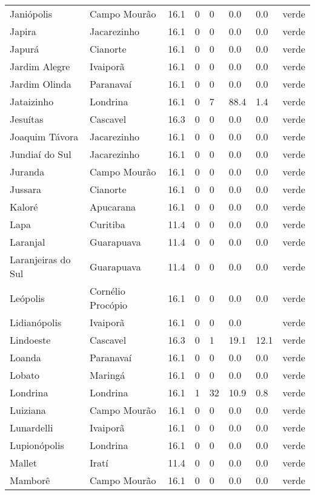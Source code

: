 \begin{longtable}{l|lllllll}
  Janiópolis & Campo Mourão & 16.1 & 0 & 0 & 0.0 & 0.0 & verde \\ 
  Japira & Jacarezinho & 16.1 & 0 & 0 & 0.0 & 0.0 & verde \\ 
  Japurá & Cianorte & 16.1 & 0 & 0 & 0.0 & 0.0 & verde \\ 
  Jardim Alegre & Ivaiporã & 16.1 & 0 & 0 & 0.0 & 0.0 & verde \\ 
  Jardim Olinda & Paranavaí & 16.1 & 0 & 0 & 0.0 & 0.0 & verde \\ 
  Jataizinho & Londrina & 16.1 & 0 & 7 & 88.4 & 1.4 & verde \\ 
  Jesuítas & Cascavel & 16.3 & 0 & 0 & 0.0 & 0.0 & verde \\ 
  Joaquim Távora & Jacarezinho & 16.1 & 0 & 0 & 0.0 & 0.0 & verde \\ 
  Jundiaí do Sul & Jacarezinho & 16.1 & 0 & 0 & 0.0 & 0.0 & verde \\ 
  Juranda & Campo Mourão & 16.1 & 0 & 0 & 0.0 & 0.0 & verde \\ 
  Jussara & Cianorte & 16.1 & 0 & 0 & 0.0 & 0.0 & verde \\ 
  Kaloré & Apucarana & 16.1 & 0 & 0 & 0.0 & 0.0 & verde \\ 
  Lapa & Curitiba & 11.4 & 0 & 0 & 0.0 & 0.0 & verde \\ 
  Laranjal & Guarapuava & 11.4 & 0 & 0 & 0.0 & 0.0 & verde \\ 
  Laranjeiras do Sul & Guarapuava & 11.4 & 0 & 0 & 0.0 & 0.0 & verde \\ 
  Leópolis & Cornélio Procópio & 16.1 & 0 & 0 & 0.0 & 0.0 & verde \\ 
  Lidianópolis & Ivaiporã & 16.1 & 0 & 0 & 0.0 &  & verde \\ 
  Lindoeste & Cascavel & 16.3 & 0 & 1 & 19.1 & 12.1 & verde \\ 
  Loanda & Paranavaí & 16.1 & 0 & 0 & 0.0 & 0.0 & verde \\ 
  Lobato & Maringá & 16.1 & 0 & 0 & 0.0 & 0.0 & verde \\ 
  Londrina & Londrina & 16.1 & 1 & 32 & 10.9 & 0.8 & verde \\ 
  Luiziana & Campo Mourão & 16.1 & 0 & 0 & 0.0 & 0.0 & verde \\ 
  Lunardelli & Ivaiporã & 16.1 & 0 & 0 & 0.0 & 0.0 & verde \\ 
  Lupionópolis & Londrina & 16.1 & 0 & 0 & 0.0 & 0.0 & verde \\ 
  Mallet & Iratí & 11.4 & 0 & 0 & 0.0 & 0.0 & verde \\ 
  Mamborê & Campo Mourão & 16.1 & 0 & 0 & 0.0 & 0.0 & verde \\ 

\end{longtable}
